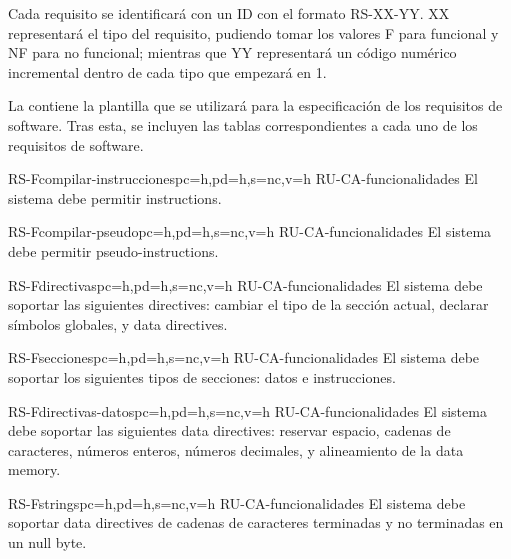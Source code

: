 Cada requisito se identificará con un ID con el formato RS-XX-YY. XX
representará el tipo del requisito, pudiendo tomar los valores F para funcional
y NF para no funcional; mientras que YY representará un código numérico incremental
dentro de cada tipo que empezará en 1.

La  contiene la plantilla que se utilizará para la
especificación de los requisitos de software. Tras esta, se incluyen las tablas
correspondientes a cada uno de los requisitos de software.



\begin{softwareReq}{RS-F}{compilar-instrucciones}{pc=h,pd=h,s=nc,v=h}
    {RU-CA-funcionalidades}
    El sistema debe permitir  \glspl{instruction}.
\end{softwareReq}

\begin{softwareReq}{RS-F}{compilar-pseudo}{pc=h,pd=h,s=nc,v=h}
    {RU-CA-funcionalidades}
    El sistema debe permitir  \glspl{pseudo-instruction}.
\end{softwareReq}

\begin{softwareReq}{RS-F}{directivas}{pc=h,pd=h,s=nc,v=h}
    {RU-CA-funcionalidades}
    El sistema debe soportar las siguientes \glspl{directive}: cambiar el tipo
    de la sección actual, declarar símbolos globales, y \glspl{data directive}.
\end{softwareReq}

\begin{softwareReq}{RS-F}{secciones}{pc=h,pd=h,s=nc,v=h}
    {RU-CA-funcionalidades}
    El sistema debe soportar los siguientes tipos de secciones: datos e
    instrucciones.
\end{softwareReq}

\begin{softwareReq}{RS-F}{directivas-datos}{pc=h,pd=h,s=nc,v=h}
    {RU-CA-funcionalidades}
    El sistema debe soportar las siguientes \glspl{data directive}: reservar
    espacio, cadenas de caracteres, números enteros, números decimales, y
    alineamiento de la \gls{data memory}.
\end{softwareReq}

\begin{softwareReq}{RS-F}{strings}{pc=h,pd=h,s=nc,v=h}
    {RU-CA-funcionalidades}
    El sistema debe soportar \glspl{data directive} de cadenas de
    caracteres terminadas y no terminadas en un \gls{null byte}.
\end{softwareReq}


